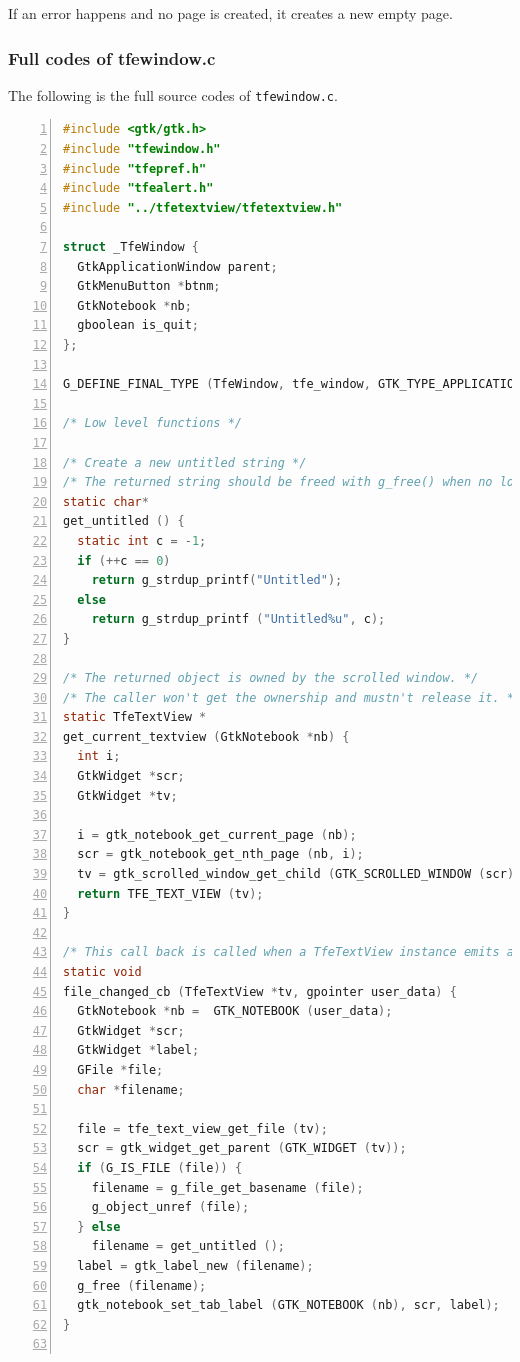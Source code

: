 If an error happens and no page is created, it creates a new empty page.

\subsubsection{Full codes of
tfewindow.c}\label{full-codes-of-tfewindow.c}

The following is the full source codes of
\passthrough{\lstinline!tfewindow.c!}.

\begin{lstlisting}[language=C, numbers=left]
#include <gtk/gtk.h>
#include "tfewindow.h"
#include "tfepref.h"
#include "tfealert.h"
#include "../tfetextview/tfetextview.h"

struct _TfeWindow {
  GtkApplicationWindow parent;
  GtkMenuButton *btnm;
  GtkNotebook *nb;
  gboolean is_quit;
};

G_DEFINE_FINAL_TYPE (TfeWindow, tfe_window, GTK_TYPE_APPLICATION_WINDOW);

/* Low level functions */

/* Create a new untitled string */
/* The returned string should be freed with g_free() when no longer needed. */
static char*
get_untitled () {
  static int c = -1;
  if (++c == 0) 
    return g_strdup_printf("Untitled");
  else
    return g_strdup_printf ("Untitled%u", c);
}

/* The returned object is owned by the scrolled window. */
/* The caller won't get the ownership and mustn't release it. */
static TfeTextView *
get_current_textview (GtkNotebook *nb) {
  int i;
  GtkWidget *scr;
  GtkWidget *tv;

  i = gtk_notebook_get_current_page (nb);
  scr = gtk_notebook_get_nth_page (nb, i);
  tv = gtk_scrolled_window_get_child (GTK_SCROLLED_WINDOW (scr));
  return TFE_TEXT_VIEW (tv);
}

/* This call back is called when a TfeTextView instance emits a "change-file" signal. */
static void
file_changed_cb (TfeTextView *tv, gpointer user_data) {
  GtkNotebook *nb =  GTK_NOTEBOOK (user_data);
  GtkWidget *scr;
  GtkWidget *label;
  GFile *file;
  char *filename;

  file = tfe_text_view_get_file (tv);
  scr = gtk_widget_get_parent (GTK_WIDGET (tv));
  if (G_IS_FILE (file)) {
    filename = g_file_get_basename (file);
    g_object_unref (file);
  } else
    filename = get_untitled ();
  label = gtk_label_new (filename);
  g_free (filename);
  gtk_notebook_set_tab_label (GTK_NOTEBOOK (nb), scr, label);
}


\end{lstlisting}
